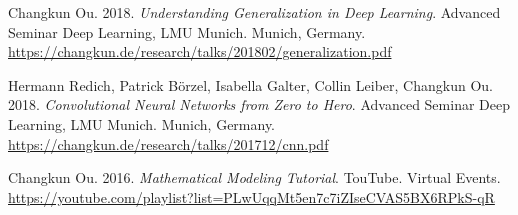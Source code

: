     \item{
      Changkun Ou. 2018.
      \emph{Understanding Generalization in Deep Learning}.
      Advanced Seminar Deep Learning, LMU Munich. Munich, Germany.
      \url{https://changkun.de/research/talks/201802/generalization.pdf}
    }
    \item{
      Hermann Redich, Patrick Börzel, Isabella Galter, Collin Leiber, Changkun Ou. 2018.
      \emph{Convolutional Neural Networks from Zero to Hero}.
      Advanced Seminar Deep Learning, LMU Munich. Munich, Germany.
      \url{https://changkun.de/research/talks/201712/cnn.pdf}
    }
    \item{
        Changkun Ou. 2016.
        \emph{Mathematical Modeling Tutorial}.
        TouTube. Virtual Events.
        \url{https://youtube.com/playlist?list=PLwUqqMt5en7c7iZIseCVAS5BX6RPkS-qR}
    }
\resumeSubHeadingListEnd
